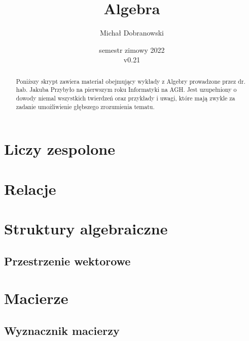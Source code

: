 \documentclass[11pt]{scrartcl}
\title{Algebra}
\author{Michał Dobranowski}
\date{semestr zimowy 2022 \\ v0.21}
\begin{document}
    \maketitle
    \begin{abstract}
        \noindent Poniższy skrypt zawiera materiał obejmujący wykłady z Algebry prowadzone przez dr. hab. Jakuba Przybyło na pierwszym roku Informatyki na AGH. Jest uzupełniony o dowody niemal wszystkich twierdzeń oraz przykłady i uwagi, które mają zwykle za zadanie umożliwienie głębszego zrozumienia tematu.
    \end{abstract}
    \tableofcontents
    \eject

    \section{Liczy zespolone}
    

    \section{Relacje}
    

    \section{Struktury algebraiczne}
    

        \subsection{Przestrzenie wektorowe}
        


    \section{Macierze}
    

        \subsection{Wyznacznik macierzy}
        
\end{document}
